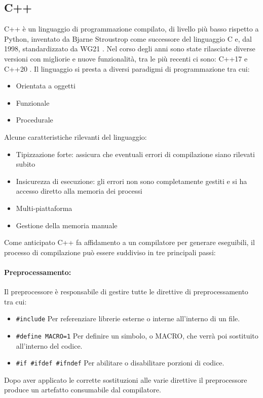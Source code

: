     \subsection{C++}
    C++ è un linguaggio di programmazione compilato, di livello più basso rispetto a Python, inventato da Bjarne
    Stroustrop come successore del linguaggio C e, dal 1998, standardizzato da WG21 \cite{ISO:1998:IIP}. Nel corso
    degli anni sono state rilasciate diverse versioni con migliorie e nuove funzionalità, tra le più recenti ci sono:
    C++17 \cite{Cpp17} e C++20 \cite{N4817}. Il linguaggio si presta a diversi paradigmi di programmazione tra cui:
    \begin{itemize}
        \item Orientata a oggetti
        \item Funzionale
        \item Procedurale
    \end{itemize}
    Alcune caratteristiche rilevanti del linguaggio:
    \begin{itemize}
        \item Tipizzazione forte: assicura che eventuali errori di compilazione siano rilevati subito
        \item Insicurezza di esecuzione: gli errori non sono completamente gestiti e si
        ha accesso diretto alla memoria dei processi
        \item Multi-piattaforma
        \item Gestione della memoria manuale
    \end{itemize}

    Come anticipato C++ fa affidamento a un compilatore per generare eseguibili, il processo di
    compilazione può essere suddiviso in tre principali passi:

    \paragraph{Preprocessamento:}
    Il preprocessore è responsabile di gestire tutte le direttive di preprocessamento tra cui:
    \begin{itemize}
        \item \texttt{\#include}
        Per referenziare librerie esterne o interne all'interno di un file.
        \item \texttt{\#define MACRO=1}
        Per definire un simbolo, o MACRO, che verrà poi sostituito all'interno del codice.
        \item \texttt{\#if \#ifdef \#ifndef}
        Per abilitare o disabilitare porzioni di codice.
    \end{itemize}
    Dopo aver applicato le corrette sostituzioni alle varie direttive il preprocessore produce un artefatto
    consumabile dal compilatore.\par

